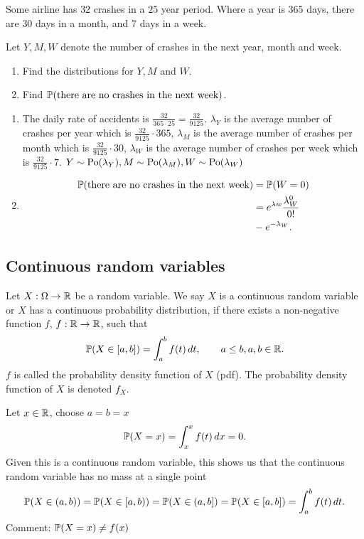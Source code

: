 \documentclass[10pt, a4paper]{article}
\begin{document}
\begin{example}
    Some airline has $32$ crashes in a $25$ year period.
    Where a year is $365$ days,
    there are $30$ days in a month,
    and $7$ days in a week.

    Let $Y, M, W$ denote the number of crashes in the next year,
    month
    and week.
    \begin{enumerate}[label = (\alph*)]
        \item Find the distributions for $Y, M$ and $W$.
        \item Find $\P(\text{there are no crashes in the next week})$.
    \end{enumerate}
    \begin{enumerate}[label = (\alph*)]
        \item 
        The daily rate of accidents is $\frac{32}{365 \cdot 25} = \frac{32}{9125}$.
        $\lambda_Y$ is the average number of crashes per year which is $\frac{32}{9125} \cdot 365$,
        $\lambda_M$ is the average number of crashes per month which is $\frac{32}{9125} \cdot 30$,
        $\lambda_W$ is the average number of crashes per week which is $\frac{32}{9125} \cdot 7$.
        $Y \sim \Po(\lambda_Y), M \sim \Po(\lambda_M), W \sim \Po(\lambda_W)$
        \item
        \begin{align*}
            \P(\text{there are no crashes in the next week}) &= \P(W = 0) \\
            &= e ^ {\lambda w}\frac{\lambda_W ^ 0}{0!} \\
            &- e ^ {-\lambda_W}.
        \end{align*}
    \end{enumerate}
\end{example}

\subsection{Continuous random variables}
\begin{definition}
    Let $X : \Omega \rightarrow \R$ be a random variable.
    We say $X$ is a continuous random variable or $X$ has a continuous probability distribution,
    if there exists a non-negative function $f$,
    $f : \R \rightarrow \R$,
    such that
    \[
    \P(X \in [a, b]) = \int_a^bf(t)\,dt,\qquad a \leq b, a, b \in \R.
    \]
    $f$ is called the probability density function of $X$ (pdf).
    The probability density function of $X$ is denoted $f_X$.
\end{definition}
Let $x \in \R$,
choose $a = b = x$
\[
\P(X = x) = \int_x^xf(t)\,dx = 0.
\]
Given this is a continuous random variable,
this shows us that the continuous random variable has no mass at a single point
\[
\P(X \in (a, b)) = \P(X \in [a, b)) = \P(X \in (a, b]) = \P(X \in [a, b]) = \int_a^bf(t)\,dt.
\]
Comment: $\P(X = x) \neq f(x)$
\end{document}
